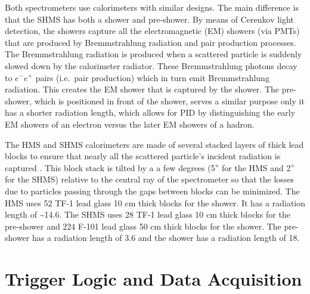 \documentclass[
]{report}
\begin{document}
Both spectrometers use calorimeters with similar designs. The main
difference is that the SHMS has both a shower and pre-shower. By means
of Cerenkov light detection, the showers capture all the electromagnetic
(EM) showers (via PMTs) that are produced by Bremmstrahlung radiation
and pair production processes. The Bremmstrahlung radiation is produced
when a scattered particle is suddenly slowed down by the calorimeter
radiator. These Bremmstrahlung photons decay to \(e^-e^+\) pairs
(i.e.~pair production) which in turn emit Bremmstrahlung radiation. This
creates the EM shower that is captured by the shower. The pre-shower,
which is positioned in front of the shower, serves a similar purpose
only it has a shorter radiation length, which allows for PID by
distinguishing the early EM showers of an electron versus the later EM
showers of a hadron.



The HMS and SHMS calorimeters are made of several stacked layers of
thick lead blocks to ensure that nearly all the scattered particle's
incident radiation is captured \cite{mkrtchyan_lead-glass_2013}. This
block stack is tilted by a a few degrees (5\(\degree\) for the HMS and
2\(\degree\) for the SHMS) relative to the central ray of the
spectrometer so that the losses due to particles passing through the
gaps between blocks can be minimized. The HMS uses 52 TF-1 lead glass 10
cm thick blocks for the shower. It has a radiation length of
\textasciitilde14.6. The SHMS uses 28 TF-1 lead glass 10 cm thick blocks
for the pre-shower and 224 F-101 lead glass 50 cm thick blocks for the
shower. The pre-shower has a radiation length of 3.6 and the shower has
a radiation length of 18.

\hypertarget{Section-4.6}{%
\section{Trigger Logic and Data Acquisition}\label{Section-4.6}}
\end{document}
